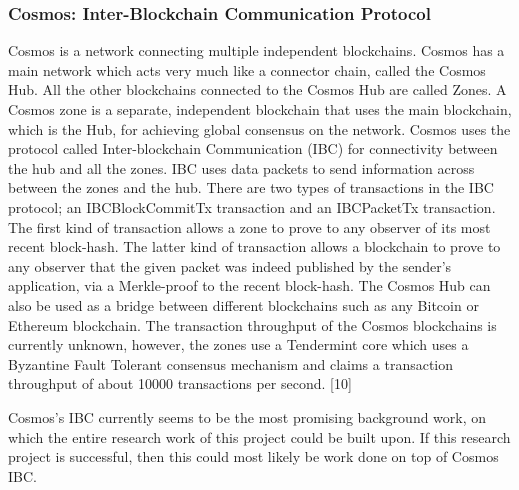 \documentclass[a4paper,twoside,phd]{BYUPhys}
\begin{document}
\subsubsection{Cosmos: Inter-Blockchain Communication Protocol}
Cosmos is a network connecting multiple independent blockchains. Cosmos has a main network which acts very much like a connector chain, called the Cosmos Hub. All the other blockchains connected to the Cosmos Hub are called Zones. A Cosmos zone is a separate, independent blockchain that uses the main blockchain, which is the Hub, for achieving global consensus on the network. Cosmos uses the protocol called Inter-blockchain Communication (IBC) for connectivity between the hub and all the zones. IBC uses data packets to send information across between the zones and the hub. There are two types of transactions in the IBC protocol; an IBCBlockCommitTx transaction and an IBCPacketTx transaction. The first kind of transaction allows a zone to prove to any observer of its most recent block-hash. The latter kind of transaction allows a blockchain to prove to any observer that the given packet was indeed published by the sender's application, via a Merkle-proof to the recent block-hash. The Cosmos Hub can also be used as a bridge between different blockchains such as any Bitcoin or Ethereum blockchain. The transaction throughput of the Cosmos blockchains is currently unknown, however, the zones use a Tendermint core which uses a Byzantine Fault Tolerant consensus mechanism and claims a transaction throughput of about 10000 transactions per second. [10] \par
Cosmos’s IBC currently seems to be the most promising background work, on which the entire research work of this project could be built upon. If this research project is successful, then this could most likely be work done on top of Cosmos IBC.
\end{document}
